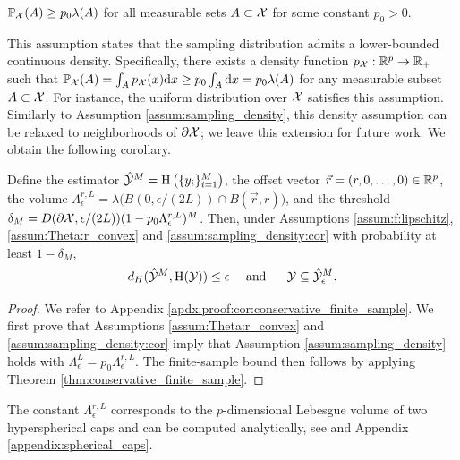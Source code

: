 \documentclass[12pt]{l4dc2022} %
\begin{document}
 \begin{myassumption}\label{assum:sampling_density:cor}
% 
$\mathbb{P}_{\mathcal{X}}(A)\geq p_0\lambda(A)$ for all  
 	measurable sets $A\subset\mathcal{X}$ for some constant $p_0>0$.
 \end{myassumption}
This assumption states that the sampling distribution %
admits a lower-bounded continuous density. 
 Specifically, there exists a density function $p_{\mathcal{X}}:\mathbb{R}^p\rightarrow\mathbb{R}_+$ such that $ 
\mathbb{P}_{\mathcal{X}}(A)
=
\int_{A} p_{\mathcal{X}}(x)\textrm{d} x\geq p_0\int_{A} \textrm{d} x=p_0\lambda(A)$ for any measurable subset $A\subset\mathcal{X}$. 
% 
% 
% 
% 
% 
% 
For instance, the uniform distribution over $\mathcal{X}$ satisfies this assumption. 
Similarly to Assumption \ref{assum:sampling_density}, this density assumption %
can be relaxed to neighborhoods %
of $\partial\mathcal{X}$; we leave this extension for future work.  
We obtain the following corollary.



% 

\begin{cor}%
\label{cor:conservative_finite_sample} 
 Define the estimator $\hat{\mathcal{Y}}^M=\textrm{H}\left(\{y_i\}_{i{=}1}^M\right)$, 
 the offset vector 
 $\vec{r}=(r,0,\dots,0)\in\mathbb{R}^p$, 
 the volume $\Lambda_{\epsilon}^{r,L}=\lambda\big(
 B(0,\epsilon/(2L)) 
 \cap B(\vec{r},r)
 \big)$, 
 and the threshold
 $
 \delta_M= 
 D(\partial\mathcal{X},\epsilon/(2L))\smash{(1 -
 	p_0 \Lambda_{\epsilon}^{r,L}
 )^M}
 $.
% 
Then, under Assumptions \ref{assum:f:lipschitz},  \ref{assum:Theta:r_convex} and \ref{assum:sampling_density:cor} 
with probability at least $ 1-\delta_M$,
$$
% 
d_H(
\hat\Y^M, 
\hull(\Y)
)\leq \epsilon
% 
\quad \text{ and }\quad\ 
% 
\Y\subseteq\hat\Y_\epsilon^M.
% 
$$
\end{cor}
\begin{proof}
We refer to Appendix \ref{apdx:proof:cor:conservative_finite_sample}.
We first prove that Assumptions \ref{assum:Theta:r_convex} and \ref{assum:sampling_density:cor} imply that Assumption \ref{assum:sampling_density} holds with $\Lambda_{\epsilon}^{L}=p_0\Lambda_{\epsilon}^{r,L}$. 
The finite-sample bound then follows by applying Theorem \ref{thm:conservative_finite_sample}. 
\end{proof}

The constant $\Lambda_{\epsilon}^{r,L}$ corresponds to the $p$-dimensional Lebesgue volume of two hyperspherical caps and can be computed analytically, see \citep{Li2011,Petitjean2013} and Appendix \ref{appendix:spherical_caps}.
\end{document}
